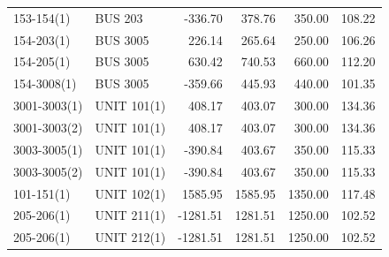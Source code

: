 \documentclass[10pt]{report}
\begin{document}
\begin{table}[H]
{\begin{tabular}{llrrrr}
153-154(1) & BUS 203 & -336.70 & 378.76 & 350.00 & 108.22 \\
154-203(1) & BUS 3005 & 226.14 & 265.64 & 250.00 & 106.26 \\
154-205(1) & BUS 3005 & 630.42 & 740.53 & 660.00 & 112.20 \\
154-3008(1) & BUS 3005 & -359.66 & 445.93 & 440.00 & 101.35 \\
3001-3003(1) & UNIT 101(1) & 408.17 & 403.07 & 300.00 & 134.36 \\
3001-3003(2) & UNIT 101(1) & 408.17 & 403.07 & 300.00 & 134.36 \\
3003-3005(1) & UNIT 101(1) & -390.84 & 403.67 & 350.00 & 115.33 \\
3003-3005(2) & UNIT 101(1) & -390.84 & 403.67 & 350.00 & 115.33 \\
101-151(1) & UNIT 102(1) & 1585.95 & 1585.95 & 1350.00 & 117.48 \\
205-206(1) & UNIT 211(1) & -1281.51 & 1281.51 & 1250.00 & 102.52 \\
205-206(1) & UNIT 212(1) & -1281.51 & 1281.51 & 1250.00 & 102.52 \\
\bottomrule
\end{tabular}}
\end{table}
\end{document}
